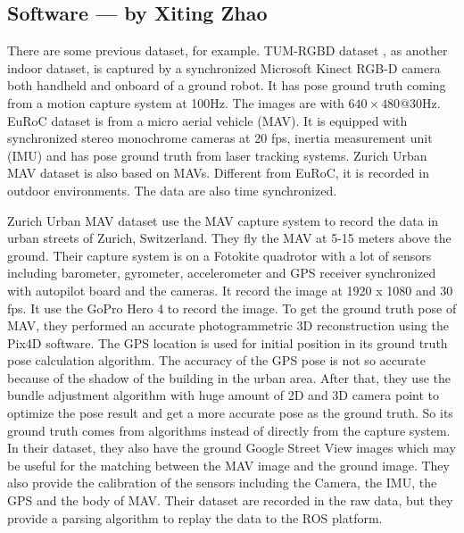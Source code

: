 \documentclass[conference]{IEEEtran}
\begin{document}
\subsection{Software --- by Xiting Zhao}
There are some previous dataset, for example.
TUM-RGBD dataset \cite{TUM-RGBD}, as another indoor dataset, is captured by a synchronized Microsoft Kinect RGB-D camera both handheld and onboard of a ground robot. It has pose ground truth coming from a motion capture system at 100Hz. The images are with $640\times 480@30$Hz. 
EuRoC dataset\cite{EuRoC} is from a micro aerial vehicle (MAV). It is equipped with synchronized stereo monochrome cameras at 20 fps, inertia measurement unit (IMU) and has pose ground truth from laser tracking systems.
Zurich Urban MAV dataset \cite{Zurich_Urban_MAV} is also based on MAVs. Different from EuRoC, it is recorded in outdoor environments. The data are also time synchronized.

Zurich Urban MAV dataset use the MAV capture system to record the data in urban streets of Zurich, Switzerland. They fly the MAV at 5-15 meters above the ground. Their capture system is on a Fotokite quadrotor with a lot of sensors including barometer, gyrometer, accelerometer and GPS receiver synchronized with autopilot board and the cameras. It record the image at 1920 x 1080 and 30 fps. It use the GoPro Hero 4 to record the image. To get the ground truth pose of MAV, they performed an accurate photogrammetric 3D reconstruction using the Pix4D software. The GPS location is used for initial position in its ground truth pose calculation algorithm. The accuracy of the GPS pose is not so accurate because of the shadow of the building in the urban area. After that, they use the bundle adjustment algorithm with huge amount of 2D and 3D camera point to optimize the pose result and get a more accurate pose as the ground truth. So its ground truth comes from algorithms instead of directly from the capture system. In their dataset, they also have the ground Google Street View images which may be useful for the matching between the MAV image and the ground image. They also provide the calibration of the sensors including the Camera, the IMU, the GPS and the body of MAV. Their dataset are recorded in the raw data, but they provide a parsing algorithm to replay the data to the ROS platform.
\end{document}
